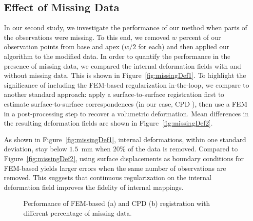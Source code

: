 \documentclass[runningheads,a4paper]{llncs}
\begin{document}
\subsection{Effect of Missing Data}\label{sec:missing}
In our second study, we investigate the performance of our method when parts of the observations were missing. To this end, we removed $w$ percent of our observation points from base and apex ($w/2$ for each) and then applied our algorithm to the modified data. In order to quantify the performance in the presence of missing data, we compared the internal deformation fields with and without missing data. This is shown in Figure~\ref{fig:missingDef1}.  To highlight the significance of including the FEM-based regularization in-the-loop, we compare to another standard approach: apply a surface-to-surface registration first to estimate surface-to-surface correspondences (in our case, CPD \cite{Myronenko10a}), then use a FEM in a post-processing step to recover a volumetric deformation.  Mean differences in the resulting deformation fields are shown in Figure~\ref{fig:missingDef2}.

As shown in Figure~\ref{fig:missingDef1}, internal deformations, within one standard deviation, stay below $1.5$~mm  when $20\%$ of the data is removed. Compared to Figure~\ref{fig:missingDef2}, using surface displacements as boundary conditions for FEM-based yields larger errors when the same number of observations are removed. This suggests that continuous regularization on the internal deformation field improves the fidelity of internal mappings.

\begin{figure}[t]
\center
\caption{Performance of FEM-based (a) and CPD (b) registration with different percentage of missing data.}
\label{fig:missingDef}
\end{figure}
\end{document}
